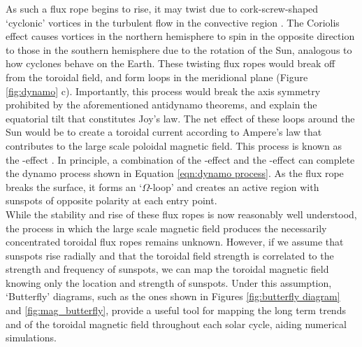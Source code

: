 \documentclass[11pt,a4paper,onecolumn]{report}
\begin{document}
As such a flux rope begins to rise, it may twist due to cork-screw-shaped
`cyclonic' vortices in the turbulent flow in the convective region
\citep{parker_formation_1955}. The Coriolis effect causes vortices in the
northern hemisphere to spin in the opposite direction to those in the southern
hemisphere due to the rotation of the Sun, analogous to how cyclones behave on
the Earth. These twisting flux ropes would break off from the toroidal field,
and form loops in the meridional plane (Figure \ref{fig:dynamo} c). Importantly,
this process would break the axis symmetry prohibited by the aforementioned
antidynamo theorems, and explain the equatorial tilt that constitutes Joy's law.
The net effect of these loops around the Sun would be to create a toroidal
current according to Ampere's law that contributes to the large scale poloidal
magnetic field. This process is known as the \textalpha-effect
\citep{parker_hydromagnetic_1955}. In principle, a combination of the
\textalpha-effect and the \textomega-effect can complete the dynamo process
shown in Equation \ref{eqn:dynamo process}. As the flux rope breaks the surface,
it forms an `\(\Omega\)-loop' and creates an active region with sunspots of
opposite polarity at each entry point. \\

While the stability and rise of these flux ropes is now reasonably well
understood, the process in which the large scale magnetic field produces the
necessarily concentrated toroidal flux ropes remains unknown. However, if
we assume that sunspots rise radially and that the toroidal field strength is
correlated to the strength and frequency of sunspots, we can map the toroidal
magnetic field knowing only the location and strength of sunspots. Under this
assumption, `Butterfly' diagrams, such as the ones shown in Figures
\ref{fig:butterfly diagram} and \ref{fig:mag_butterfly}, provide a useful tool
for mapping the long term trends and of the toroidal magnetic field throughout
each solar cycle, aiding numerical simulations. \\
\end{document}
